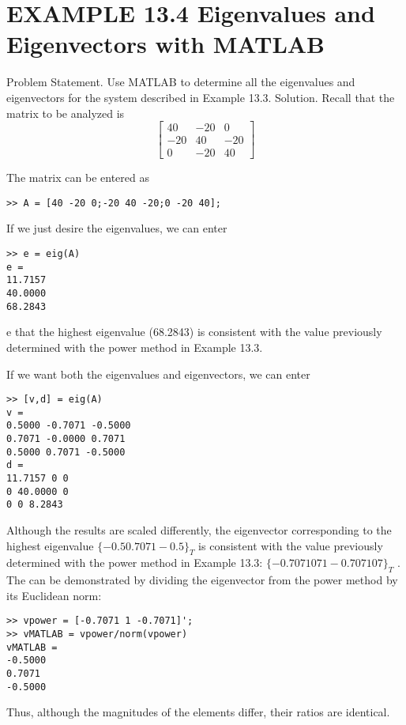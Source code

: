 \documentclass[../main.tex]{subfiles}
\begin{document}
\section*{EXAMPLE 13.4 Eigenvalues and Eigenvectors with MATLAB}

Problem Statement. Use MATLAB to determine all the eigenvalues and eigenvectors
for the system described in Example 13.3.
Solution. Recall that the matrix to be analyzed is
\begin{equation}
\begin{bmatrix}
40 & -20 & 0\\
-20 & 40 & -20\\
0 & -20 & 40
\end{bmatrix}
\end{equation}

The matrix can be entered as
\begin{lstlisting}[numbers=none]
>> A = [40 -20 0;-20 40 -20;0 -20 40];
\end{lstlisting}

If we just desire the eigenvalues, we can enter
\begin{lstlisting}[numbers=none]
>> e = eig(A)
e =
11.7157
40.0000
68.2843
\end{lstlisting}

e that the highest eigenvalue (68.2843) is consistent with the value previously determined with the power method in Example 13.3.

If we want both the eigenvalues and eigenvectors, we can enter
\begin{lstlisting}[numbers=none]
>> [v,d] = eig(A)
v =
0.5000 -0.7071 -0.5000
0.7071 -0.0000 0.7071
0.5000 0.7071 -0.5000
d =
11.7157 0 0
0 40.0000 0
0 0 8.2843
\end{lstlisting}

Although the results are scaled differently, the eigenvector corresponding to the highest eigenvalue $\{-0.5 0.7071 -0.5\}_{T}$ is consistent with the value previously determined
with the power method in Example 13.3: $\{-0.707107 1 -0.707107\}_{T}$
. The can be demonstrated by dividing the eigenvector from the power method by its Euclidean norm:
\begin{lstlisting}[numbers=none]
>> vpower = [-0.7071 1 -0.7071]';
>> vMATLAB = vpower/norm(vpower)
vMATLAB =
-0.5000
0.7071
-0.5000
\end{lstlisting}

Thus, although the magnitudes of the elements differ, their ratios are identical.
\end{document}
